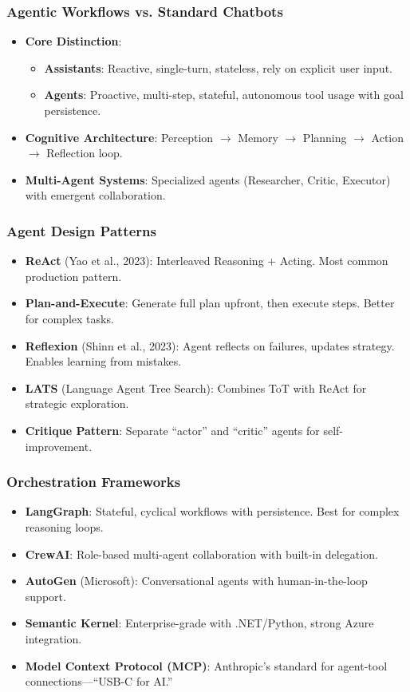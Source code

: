 \documentclass{beamer}
\begin{document}
\begin{frame}
    \frametitle{Agentic Workflows vs. Standard Chatbots}
    \begin{itemize}
        \item \textbf{Core Distinction}:
        \begin{itemize}
            \item \textbf{Assistants}: Reactive, single-turn, stateless, rely on explicit user input.
            \item \textbf{Agents}: Proactive, multi-step, stateful, autonomous tool usage with goal persistence.
        \end{itemize}
        \item \textbf{Cognitive Architecture}: Perception $\rightarrow$ Memory $\rightarrow$ Planning $\rightarrow$ Action $\rightarrow$ Reflection loop.
        \item \textbf{Multi-Agent Systems}: Specialized agents (Researcher, Critic, Executor) with emergent collaboration.
    \end{itemize}
\end{frame}

\begin{frame}
    \frametitle{Agent Design Patterns}
    \begin{itemize}
        \item \textbf{ReAct} (Yao et al., 2023): Interleaved Reasoning + Acting. Most common production pattern.
        \item \textbf{Plan-and-Execute}: Generate full plan upfront, then execute steps. Better for complex tasks.
        \item \textbf{Reflexion} (Shinn et al., 2023): Agent reflects on failures, updates strategy. Enables learning from mistakes.
        \item \textbf{LATS} (Language Agent Tree Search): Combines ToT with ReAct for strategic exploration.
        \item \textbf{Critique Pattern}: Separate ``actor'' and ``critic'' agents for self-improvement.
    \end{itemize}
\end{frame}

\begin{frame}
    \frametitle{Orchestration Frameworks}
    \begin{itemize}
        \item \textbf{LangGraph}: Stateful, cyclical workflows with persistence. Best for complex reasoning loops.
        \item \textbf{CrewAI}: Role-based multi-agent collaboration with built-in delegation.
        \item \textbf{AutoGen} (Microsoft): Conversational agents with human-in-the-loop support.
        \item \textbf{Semantic Kernel}: Enterprise-grade with .NET/Python, strong Azure integration.
        \item \textbf{Model Context Protocol (MCP)}: Anthropic's standard for agent-tool connections---``USB-C for AI.''
    \end{itemize}
\end{frame}
\end{document}
